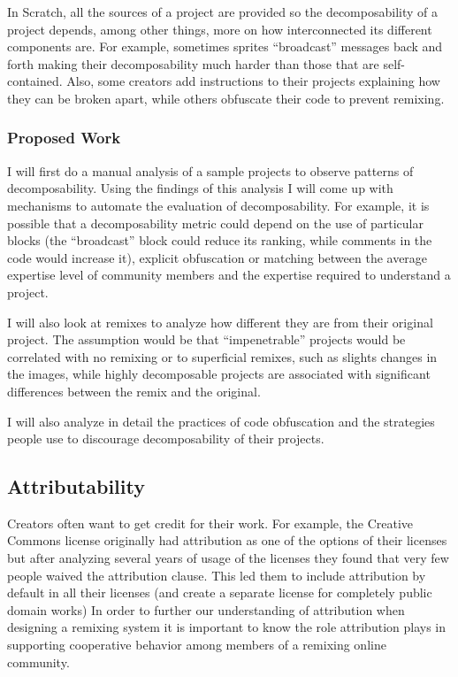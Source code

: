 In Scratch, all the sources of a project are provided so the decomposability of a project depends, among other things, more on how interconnected its different components are. 
For example, sometimes sprites ``broadcast'' messages back and forth making their decomposability much harder than those that are self-contained.
Also, some creators add instructions to their projects explaining how they can be broken apart, while others obfuscate their code to prevent remixing.

\subsubsection{Proposed Work}
I will first do a manual analysis of a sample projects to observe patterns of decomposability. 
Using the findings of this analysis I will come up with mechanisms to automate the evaluation of decomposability. 
For example, it is possible that a decomposability metric could depend on the use of particular blocks (the ``broadcast'' block could reduce its ranking, while comments in the code would increase it), explicit obfuscation or matching between the average expertise level of community members and the expertise required to understand a project.

I will also look at remixes to analyze how different they are from their original project. 
The assumption would be that ``impenetrable'' projects would be correlated with no remixing or to superficial remixes, such as slights changes in the images,
while highly decomposable projects are associated with significant differences between the remix and the original.

I will also analyze in detail the practices of code obfuscation and the strategies people use to discourage decomposability of their projects.

\subsection{Attributability}
Creators often want to get credit for their work. 
For example, the Creative Commons license originally had attribution as one of the options of their licenses but after analyzing several years of usage of the licenses they found that very few people waived the attribution clause. 
This led them to include attribution by default in all their licenses (and create a separate license for completely public domain works) \citep{brown_announcing_2004}
In order to further our understanding of attribution when designing a remixing system it is important to know the role attribution plays in supporting cooperative behavior among members of a remixing online community.

